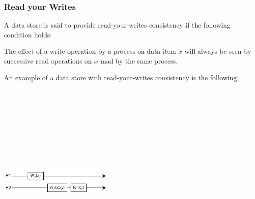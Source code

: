\documentclass{article}
\begin{document}
\subsubsection{Read your Writes}
A data store is said to provide read-your-writes consistency if the following condition holds:
\begin{changemargin}{0.4cm}{0cm} 
The effect of a write operation by a process on data item $x$ will always be seen by successive read operations on $x$ mad by the same process.
\end{changemargin}
An example of a data store with read-your-writes consistency is the following:
\begin{center}
	\includegraphics[width=5.5cm, height=10cm, keepaspectratio]{assets/read-your-writes.pdf}
\end{center}
\end{document}
